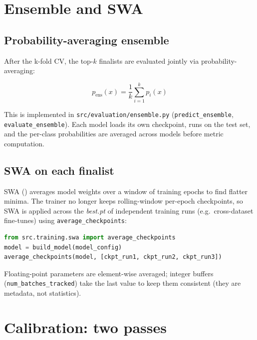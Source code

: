 \documentclass[10pt,a4paper]{article}
\begin{document}
\section{Ensemble and SWA}

\subsection{Probability-averaging ensemble}

After the k-fold CV, the top-$k$ finalists are evaluated jointly via
probability-averaging:

\begin{equation}
  p_{\text{ens}}(x) = \frac{1}{k} \sum_{i=1}^{k} p_i(x)
\end{equation}

This is implemented in \texttt{src/evaluation/ensemble.py}
(\texttt{predict\_ensemble}, \texttt{evaluate\_ensemble}). Each model
loads its own checkpoint, runs on the test set, and the per-class
probabilities are averaged across models before metric computation.

\subsection{SWA on each finalist}

SWA (\cite{izmailov:2018}) averages model weights over a window of
training epochs to find flatter minima. The trainer no longer keeps
rolling-window per-epoch checkpoints, so SWA is applied across the
\emph{best.pt} of independent training runs (e.g.\ cross-dataset
fine-tunes) using \texttt{average\_checkpoints}:

\begin{lstlisting}[language=Python, basicstyle=\ttfamily\small]
from src.training.swa import average_checkpoints
model = build_model(model_config)
average_checkpoints(model, [ckpt_run1, ckpt_run2, ckpt_run3])
\end{lstlisting}

Floating-point parameters are element-wise averaged; integer buffers
(\texttt{num\_batches\_tracked}) take the last value to keep them
consistent (they are metadata, not statistics).

\section{Calibration: two passes}
\end{document}
